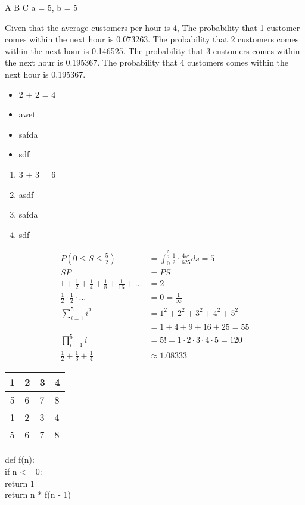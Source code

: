 \documentclass[11pt]{article}
\begin{document}
    
        A
        B
        C
a = 5, b = 5
    
    Given that the average customers per hour is 4,
    The probability that 1 customer comes within the next hour is 0.073263.
    The probability that 2 customers comes within the next hour is 0.146525.
    The probability that 3 customers comes within the next hour is 0.195367.
    The probability that 4 customers comes within the next hour is 0.195367.

    
    \begin{itemize}
        \item  2 + 2 = 4
        \item  awet
        \item  safda
        \item  sdf
    \end{itemize}
    
    \begin{enumerate}
        \item  3 + 3 = 6
        \item  asdf
        \item  safda
        \item  sdf
    \end{enumerate}
    
    \begin{align*}
        P(0 \leq S \leq \frac{5}{2}) &= \int_{0}^{\frac{5}{2}} \frac{1}{2} \cdot \frac{{4s^2}}{625} ds = 5 \\
        SP &= PS \\
        1 + \frac{1}{2}+\frac{1}{4}+\frac{1}{8}+\frac{1}{16} + \hdots &= 2 \\
        \frac{1}{2} \cdot \frac{1}{2} \cdot \hdots &= 0 = \frac{1}{\infty} \\
        \sum_{i = 1}^{5} i^2 &= 1^2+2^2+3^2+4^2+5^2 \\
        &= 1+4+9+16+25 = 55 \\
        \prod_{i = 1}^{5} i &= 5! = 1 \cdot 2 \cdot 3 \cdot 4 \cdot 5 = 120 \\
        \frac{1}{2} + \frac{1}{3} + \frac{1}{4} &\approx 1.08333
    \end{align*}
    
    \begin{center}\begin{tabular}{|c||l|l|l|}
        \hline 
        1 & 2 & 3 & 4 \\ \hline 
        5 & 6 & 7 & 8 \\ \hline 
        1 & 2 & 3 & 4 \\ \hline 
        5 & 6 & 7 & 8 \\ \hline 
    \end{tabular}
    \end{center}
    
    \ttfamily 
        def f(n): \\
            if n <= 0: \\
                return 1 \\
            
            return n * f(n - 1)
\end{document}
